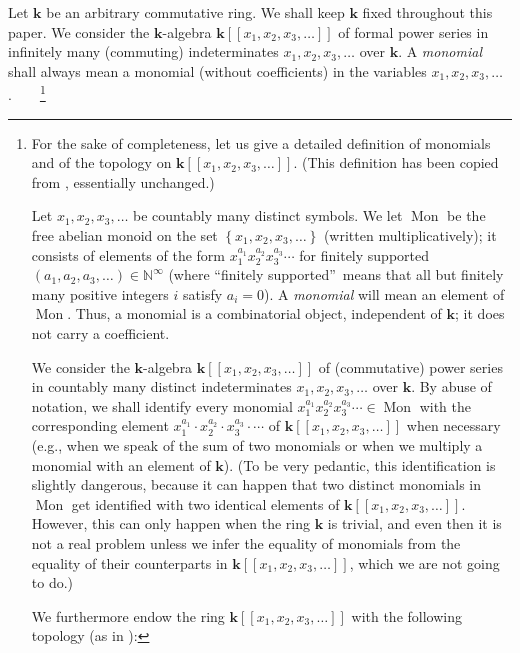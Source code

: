\documentclass[12pt]{article}
\theoremstyle{plain}
\theoremstyle{definition}
\theoremstyle{remark}
\newcommand{\kk}{{\mathbf{k}}}
\newcommand{\Powser}{\mathbf{k}\left[\left[x_1,x_2,x_3,\ldots\right]\right]}
\newcommand{\NN}{{\mathbb{N}}}
\begin{document}
Let $\kk$ be an arbitrary commutative ring. We shall keep $\kk$ fixed
throughout this paper.
We consider the $\kk$-algebra $\Powser$ of formal
power series in infinitely many (commuting) indeterminates
$x_1, x_2, x_3, \ldots$ over $\kk$. A \textit{monomial} shall always
mean a monomial (without coefficients) in the variables
$x_1, x_2, x_3, \ldots$.\ \ \ \ \footnote{For the sake of completeness,
let us give a detailed definition of monomials and of the topology
on $\Powser$. (This definition has been copied from
\cite[\S 2]{Gri-dimm}, essentially unchanged.)

Let $x_{1},x_{2},x_{3},\ldots$ be countably many distinct symbols. We
let $\operatorname{Mon}$ be the free abelian monoid on the set $\left\{
x_{1},x_{2},x_{3},\ldots\right\}  $ (written multiplicatively); it consists of
elements of the form $x_{1}^{a_{1}}x_{2}^{a_{2}}x_{3}^{a_{3}}\cdots$ for
finitely supported $\left(  a_{1},a_{2},a_{3},\ldots\right)  \in
 \NN ^{\infty}$ (where \textquotedblleft finitely
supported\textquotedblright\ means that all but finitely many positive
integers $i$ satisfy $a_{i}=0$). A \textit{monomial} will mean an element of
$\operatorname{Mon}$. Thus, a monomial is a combinatorial
object, independent of $\mathbf{k}$; it does not carry a coefficient.

We consider the $\mathbf{k}$-algebra $\Powser$ of (commutative) power
series in
countably many distinct indeterminates $x_{1},x_{2},x_{3},\ldots$ over
$\mathbf{k}$. By abuse of notation, we shall identify every monomial
$x_{1}^{a_{1}}x_{2}^{a_{2}}x_{3}^{a_{3}}\cdots\in\operatorname{Mon}$ with the
corresponding element $x_{1}^{a_{1}}\cdot x_{2}^{a_{2}}\cdot x_{3}^{a_{3}%
}\cdot\cdots$ of $\Powser$ when necessary
(e.g., when we speak of the sum of two monomials or
when we multiply a monomial with an element of $\mathbf{k}$). (To be
very pedantic, this identification is slightly dangerous, because
it can happen that two distinct monomials in $\operatorname{Mon}$ get
identified with two identical elements of $\Powser$. However, this
can only happen when the ring $\kk$ is trivial, and even then it is
not a real problem unless we infer the equality of monomials from the
equality of their counterparts in $\Powser$, which we are not going to
do.)

We furthermore endow the ring $\Powser$ with the following topology
(as in \cite[Section 2.6]{Reiner}):

}
\end{document}
